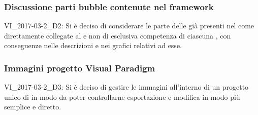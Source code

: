 \subsubsection{Discussione parti bubble contenute nel framework}
VI\_2017-03-2\_D2: Si è deciso di considerare le parte delle  già presenti nel  come direttamente collegate al  e non di esclusiva competenza di ciascuna , con conseguenze nelle descrizioni e nei grafici relativi ad esse.

\subsubsection{Immagini progetto Visual Paradigm}
VI\_2017-03-2\_D3: Si è deciso di gestire le immagini all'interno di un progetto unico di  in modo da poter controllarne esportazione e modifica in modo più semplice e diretto.

\clearpage
